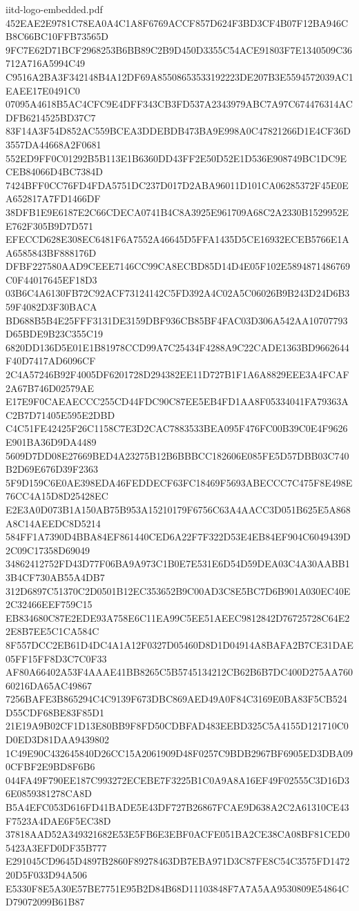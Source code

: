 \begin{filecontents*}[overwrite]{iitd-logo-embedded.pdf}
452EAE2E9781C78EA0A4C1A8F6769ACCF857D624F3BD3CF4B07F12BA946CB8C66BC10FFB73565D
9FC7E62D71BCF2968253B6BB89C2B9D450D3355C54ACE91803F7E1340509C36712A716A5994C49
C9516A2BA3F342148B4A12DF69A85508653533192223DE207B3E5594572039AC1EAEE17E0491C0
07095A4618B5AC4CFC9E4DFF343CB3FD537A2343979ABC7A97C674476314ACDFB6214525BD37C7
83F14A3F54D852AC559BCEA3DDEBDB473BA9E998A0C47821266D1E4CF36D3557DA44668A2F0681
552ED9FF0C01292B5B113E1B6360DD43FF2E50D52E1D536E908749BC1DC9ECEB84066D4BC7384D
7424BFF0CC76FD4FDA5751DC237D017D2ABA96011D101CA06285372F45E0EA652817A7FD1466DF
38DFB1E9E6187E2C66CDECA0741B4C8A3925E961709A68C2A2330B1529952EE762F305B9D7D571
EFECCD628E308EC6481F6A7552A46645D5FFA1435D5CE16932ECEB5766E1AA6585843BF888176D
DFBF227580AAD9CEEE7146CC99CA8ECBD85D14D4E05F102E5894871486769C0F44017645EF18D3
03B6C4A6130FB72C92ACF73124142C5FD392A4C02A5C06026B9B243D24D6B359F4082D3F30BACA
BD688B5B4E25FFF3131DE3159DBF936CB85BF4FAC03D306A542AA10707793D65BDE9B23C355C19
6820DD136D5E01E1B81978CCD99A7C25434F4288A9C22CADE1363BD9662644F40D7417AD6096CF
2C4A57246B92F4005DF6201728D294382EE11D727B1F1A6A8829EEE3A4FCAF2A67B746D02579AE
E17E9F0CAEAECCC255CD44FDC90C87EE5EB4FD1AA8F05334041FA79363AC2B7D71405E595E2DBD
C4C51FE42425F26C1158C7E3D2CAC7883533BEA095F476FC00B39C0E4F9626E901BA36D9DA4489
5609D7DD08E27669BED4A23275B12B6BBBCC182606E085FE5D57DBB03C740B2D69E676D39F2363
5F9D159C6E0AE398EDA46FEDDECF63FC18469F5693ABECCC7C475F8E498E76CC4A15D8D25428EC
E2E3A0D073B1A150AB75B953A15210179F6756C63A4AACC3D051B625E5A868A8C14AEEDC8D5214
584FF1A7390D4BBA84EF861440CED6A22F7F322D53E4EB84EF904C6049439D2C09C17358D69049
34862412752FD43D77F06BA9A973C1B0E7E531E6D54D59DEA03C4A30AABB13B4CF730AB55A4DB7
312D6897C51370C2D0501B12EC353652B9C00AD3C8E5BC7D6B901A030EC40E2C32466EEF759C15
EB834680C87E2EDE93A758E6C11EA99C5EE51AEEC9812842D76725728C64E22E8B7EE5C1CA584C
8F557DCC2EB61D4DC4A1A12F0327D05460D8D1D04914A8BAFA2B7CE31DAE05FF15FF8D3C7C0F33
AF80A66402A53F4AAAE41BB8265C5B5745134212CB62B6B7DC400D275AA76060216DA65AC49867
7256BAFE3B865294C4C9139F673DBC869AED49A0F84C3169E0BA83F5CB524D55CDF68BE83F85D1
21E19A9B02CF1D13E80BB9F8FD50CDBFAD483EEBD325C5A4155D121710C0D0ED3D81DAA9439802
1C49E90C432645840D26CC15A2061909D48F0257C9BDB2967BF6905ED3DBA090CFBF2E9BD8F6B6
044FA49F790EE187C993272ECEBE7F3225B1C0A9A8A16EF49F02555C3D16D36E0859381278CA8D
B5A4EFC053D616FD41BADE5E43DF727B26867FCAE9D638A2C2A61310CE43F7523A4DAE6F5EC38D
37818AAD52A349321682E53E5FB6E3EBF0ACFE051BA2CE38CA08BF81CED05423A3EFD0DF35B777
E291045CD9645D4897B2860F89278463DB7EBA971D3C87FE8C54C3575FD147220D5F033D94A506
E5330F8E5A30E57BE7751E95B2D84B68D11103848F7A7A5AA9530809E54864CD79072099B61B87

\end{filecontents*}
